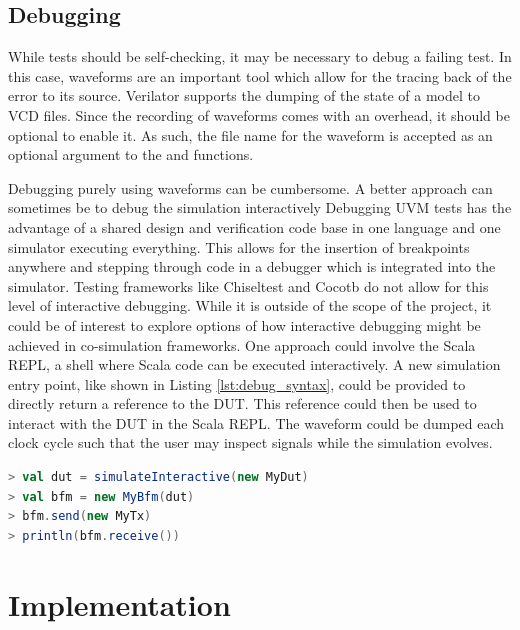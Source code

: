 \section{Debugging} %

While tests should be self-checking, it may be necessary to debug a failing test. In this case, waveforms are an
important tool which allow for the tracing back of the error to its source. Verilator supports the dumping of the
state of a model to VCD files. Since the recording of waveforms comes with an overhead, it should be optional to
enable it. As such, the file name for the waveform is accepted as an optional argument to the  and
 functions.

Debugging purely using waveforms can be cumbersome. A better approach can sometimes be to debug the simulation
interactively Debugging UVM tests has the advantage of a shared design and verification code base in one language and
one simulator executing everything. This allows for the insertion of breakpoints anywhere and stepping through code
in a debugger which is integrated into the simulator. Testing frameworks like Chiseltest and Cocotb do not allow for
this level of interactive debugging. While it is outside of the scope of the project, it could be of interest to
explore options of how interactive debugging might be achieved in co-simulation frameworks. One approach could
involve the Scala REPL, a shell where Scala code can be executed interactively. A new simulation entry point, like
shown in Listing \ref{lst:debug_syntax}, could be provided to directly return a reference to the DUT. This reference
could then be used to interact with the DUT in the Scala REPL. The waveform could be dumped each clock cycle such
that the user may inspect signals while the simulation evolves.

\begin{listing}
\begin{lstlisting}[language=scala, captionpos=b, caption=Outline of the syntax for the collection of functional coverage.,label=lst:debug_syntax]
> val dut = simulateInteractive(new MyDut)
> val bfm = new MyBfm(dut)
> bfm.send(new MyTx)
> println(bfm.receive())
\end{lstlisting}
\end{listing}

\chapter{Implementation} %

